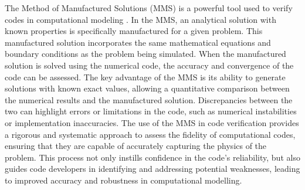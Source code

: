 \documentclass[preprint, 12pt]{elsarticle}
\begin{document}
The Method of Manufactured Solutions (MMS) is a powerful tool used to verify codes in computational modeling \cite{Roy2004, Habla2016, Muralha2020, Freno2021}. In the MMS, an analytical solution with known properties is specifically manufactured for a given problem. This manufactured solution incorporates the same mathematical equations and boundary conditions as the problem being simulated. When the manufactured solution is solved using the numerical code, the accuracy and convergence of the code can be assessed. The key advantage of the MMS is its ability to generate solutions with known exact values, allowing a quantitative comparison between the numerical results and the manufactured solution. Discrepancies between the two can highlight errors or limitations in the code, such as numerical instabilities or implementation inaccuracies. The use of the MMS in code verification provides a rigorous and systematic approach to assess the fidelity of computational codes, ensuring that they are capable of accurately capturing the physics of the problem. This process not only instills confidence in the code's reliability, but also guides code developers in identifying and addressing potential weaknesses, leading to improved accuracy and robustness in computational modelling.
\end{document}
